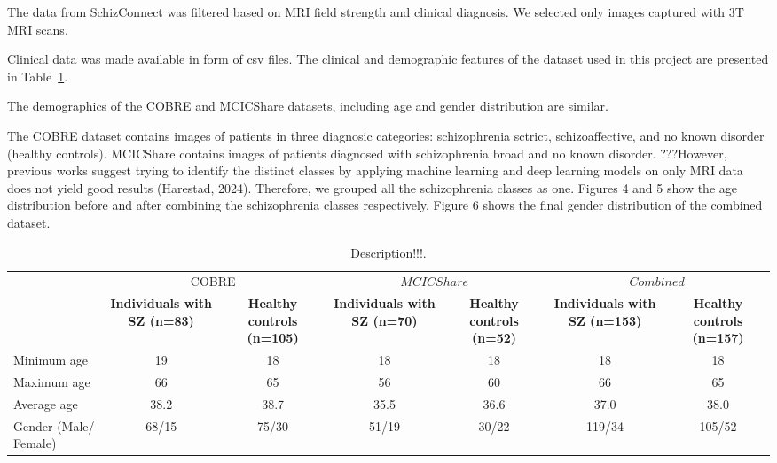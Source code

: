 The data from SchizConnect was filtered based on MRI field strength and clinical diagnosis. We selected only images captured with 3T MRI scans.

Clinical data was made available in form of csv files. The clinical and demographic features of the dataset used in this project are presented in Table~\ref{tab:cobre_mcicshare_clinical_demographic}.

The demographics of the COBRE and MCICShare datasets, including age and gender distribution are similar.

The COBRE dataset contains images of patients in three diagnosic categories: schizophrenia sctrict, schizoaffective, and no known disorder (healthy controls). MCICShare contains images of patients diagnosed with schizophrenia broad and no known disorder. 
???However, previous works suggest trying to identify the distinct classes by applying machine learning and deep learning models on only MRI data does not yield good results (Harestad, 2024). 
Therefore, we grouped all the schizophrenia classes as one. Figures 4 and 5 show the age distribution before and after combining the schizophrenia classes respectively. Figure 6 shows the final gender distribution of the combined dataset.



\begin{center}
	\begin{table}
        \centering
        \caption{\label{tab:cobre_mcicshare_clinical_demographic}Description!!!.}
        \begin{tabular*}{500pt}{@{\extracolsep\fill}lcccccc@{\extracolsep\fill}}
            \toprule
            & \multicolumn{2}{c}{COBRE} & \multicolumn{2}{c}{$MCICShare$} & \multicolumn{2}{c}{$Combined$}
            \\\cmidrule{2-4}\cmidrule{5-7}
            & \textbf{Individuals with SZ (n=83)} & \textbf{Healthy controls (n=105)} & \textbf{Individuals with SZ (n=70)} & \textbf{Healthy controls (n=52)} & \textbf{Individuals with SZ (n=153)} & \textbf{Healthy controls (n=157)} \\
            \midrule
            Minimum age             & 19  & 18  & 18	& 18 & 18 & 18 \\
            Maximum age 		    & 66  & 65 & 56 	& 60 & 66 & 65 \\
            Average age             & 38.2 & 38.7 & 35.5	& 36.6 & 37.0 & 38.0	\\
            Gender (Male/ Female)   & 68/15 & 75/30 & 51/19	& 30/22 & 119/34 & 105/52	\\
            \bottomrule
        \end{tabular*}
    \end{table}    
\end{center}

